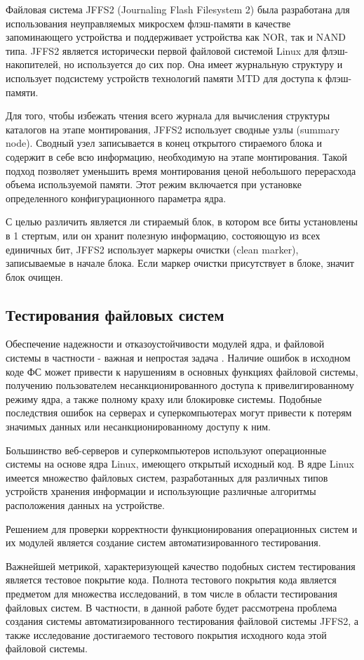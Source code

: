 Файловая система JFFS2 (Journaling Flash Filesystem 2) \cite{jffs2} была разработана для использования неуправляемых микросхем флэш-памяти в качестве запоминающего устройства и поддерживает устройства как NOR, так и NAND типа. JFFS2 является исторически первой файловой системой Linux для флэш-накопителей, но используется до сих пор. Она имеет журнальную структуру и использует подсистему устройств технологий памяти MTD для доступа к флэш-памяти.

Для того, чтобы избежать чтения всего журнала для вычисления структуры каталогов на этапе монтирования, JFFS2 использует сводные узлы (summary node). Сводный узел записывается в конец открытого стираемого блока и содержит в себе всю информацию, необходимую на этапе монтирования. Такой подход позволяет уменьшить время монтирования ценой небольшого перерасхода объема используемой памяти. Этот режим включается при установке определенного конфигурационного параметра ядра.

С целью различить является ли стираемый блок, в котором все биты установлены в 1 стертым, или он хранит полезную информацию, состояющую из всех единичных бит, JFFS2 использует маркеры очистки (clean marker), записываемые в начале блока. Если маркер очистки присутствует в блоке, значит блок очищен.

\subsection{Тестирования файловых систем}

Обеспечение надежности и отказоустойчивости модулей ядра, и файловой системы в частности - важная и непростая задача \cite{ostesting}. Наличие ошибок в исходном коде ФС может привести к нарушениям в основных функциях файловой системы, получению пользователем несанкционированного доступа к привелигированному режиму ядра, а также полному краху или блокировке системы. Подобные последствия ошибок на серверах и суперкомпьютерах могут привести к потерям значимых данных или несанкционированному доступу к ним.

Большинство веб-серверов и суперкомпьютеров используют операционные системы на основе ядра Linux, имеющего открытый исходный код. В ядре Linux имеется множество файловых систем, разработанных для различных типов устройств хранения информации и использующие различные алгоритмы расположения данных на устройстве. 

Решением для проверки корректности функционирования операционных систем и их модулей является создание систем автоматизированного тестирования.  

Важнейшей метрикой, характеризующей качество подобных систем тестирования является тестовое покрытие кода. Полнота тестового покрытия кода является предметом для множества исследований, в том числе в области тестирования файловых систем. В частности, в данной работе будет рассмотрена проблема создания системы автоматизированного тестирования файловой системы JFFS2, а также исследование достигаемого тестового покрытия исходного кода этой файловой системы.

\newpage
